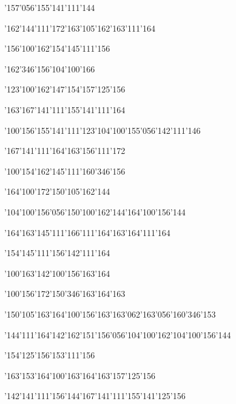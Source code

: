 \null\vfill\ipa\centerline{\enskip\enskip\enskip\enskip\enskip\enskip\enskip\char'157\char'056\char'155\char'141\char'111\char'144}\medskip\centerline{\enskip\char'162\char'144\char'111\char'172\enskip\enskip\enskip\enskip\enskip\enskip\enskip\char'163\char'105\char'162\enskip\enskip\enskip\char'163\char'111\char'164}\medskip\centerline{\enskip\enskip\enskip\enskip\enskip\enskip\char'156\char'100\char'162\enskip\char'154\char'145\char'111\char'156\enskip\enskip\enskip\enskip}\medskip\centerline{\enskip\char'162\char'346\char'156\enskip\enskip\char'104\char'100\char'166\enskip\enskip\enskip\enskip\enskip\enskip}\medskip\centerline{\enskip\enskip\enskip\char'123\char'100\char'162\enskip\enskip\enskip\enskip\char'147\char'154\char'157\char'125\char'156}\medskip\centerline{\enskip\enskip\enskip\enskip\char'163\char'167\char'141\char'111\enskip\enskip\enskip\enskip\char'155\char'141\char'111\char'164\enskip\enskip\enskip\enskip}\medskip\centerline{\enskip\char'100\char'156\enskip\char'155\char'141\char'111\char'123\enskip\char'104\char'100\char'155\char'056\char'142\char'111\char'146}\medskip\centerline{\enskip\enskip\enskip\enskip\enskip\enskip\char'167\char'141\char'111\char'164\char'163\enskip\enskip\enskip\enskip\char'156\char'111\char'172}\medskip\centerline{\enskip\char'100\char'154\enskip\char'162\char'145\char'111\enskip\enskip\enskip\enskip\char'160\char'346\char'156}\medskip\centerline{\enskip\char'164\char'100\char'172\enskip\char'150\char'105\char'162\char'144\enskip\enskip\enskip\enskip\enskip\enskip\enskip\enskip\enskip\enskip\enskip\enskip\enskip\enskip\enskip}\medskip\centerline{\enskip\enskip\enskip\enskip\char'104\char'100\char'156\char'056\char'150\char'100\char'162\char'144\enskip\enskip\enskip\enskip\enskip\enskip\enskip\enskip\char'164\char'100\char'156\char'144}\medskip\centerline{\enskip\char'164\char'163\char'145\char'111\enskip\enskip\enskip\enskip\enskip\enskip\enskip\enskip\enskip\enskip\enskip\enskip\enskip\char'166\char'111\char'164\enskip\char'163\char'164\char'111\char'164}\medskip\centerline{\enskip\enskip\enskip\enskip\char'154\char'145\char'111\char'156\enskip\enskip\enskip\enskip\char'142\char'111\char'164}\medskip\centerline{\enskip\char'100\char'163\enskip\enskip\enskip\enskip\enskip\enskip\enskip\enskip\char'142\char'100\char'156\char'163\char'164}\medskip\centerline{\enskip\char'100\char'156\char'172\enskip\enskip\enskip\enskip\enskip\enskip\enskip\enskip\enskip\enskip\enskip\enskip\char'150\char'346\char'163\char'164\char'163}\medskip\centerline{\enskip\char'150\char'105\char'163\char'164\enskip\char'100\char'156\char'163\enskip\char'163\char'062\char'163\char'056\char'160\char'346\char'153}\medskip\centerline{\enskip\char'144\char'111\char'164\enskip\char'142\char'162\char'151\char'156\char'056\char'104\char'100\char'162\enskip\char'104\char'100\char'156\char'144}\medskip\centerline{\enskip\char'154\char'125\char'156\enskip\enskip\enskip\enskip\char'153\char'111\char'156\enskip\enskip\enskip\enskip}\medskip\centerline{\enskip\enskip\enskip\char'163\char'153\char'164\char'100\char'163\char'164\enskip\enskip\enskip\enskip\enskip\char'163\char'157\char'125\char'156}\medskip\centerline{\enskip\enskip\enskip\enskip\char'142\char'141\char'111\char'156\char'144\enskip\char'167\char'141\char'111\enskip\char'155\char'141\char'125\char'156}\medskip\